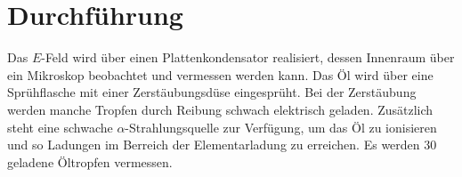 \section{Durchführung}
\label{sec:Durchführung}
Das $E$-Feld wird über einen Plattenkondensator realisiert, dessen Innenraum über ein Mikroskop beobachtet und vermessen werden kann. Das Öl wird über eine Sprühflasche mit einer Zerstäubungsdüse eingesprüht. Bei der Zerstäubung werden manche Tropfen durch Reibung schwach elektrisch geladen. Zusätzlich steht eine schwache $\alpha$-Strahlungsquelle zur Verfügung, um das Öl zu ionisieren und so Ladungen im Berreich der Elementarladung zu erreichen.
Es werden $30$ geladene Öltropfen vermessen.
